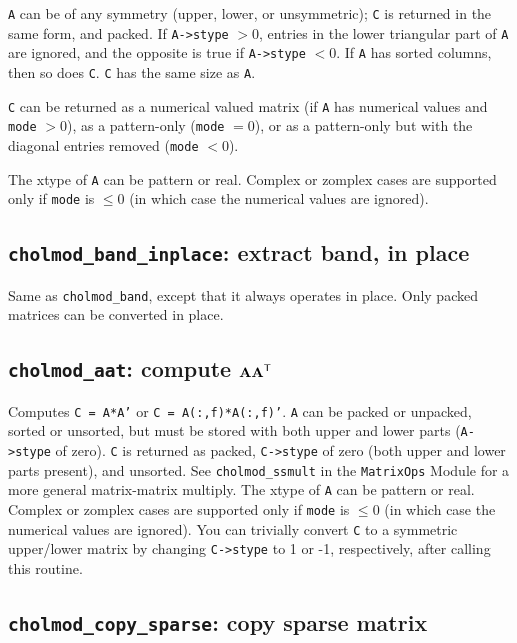 \documentclass[11pt]{article}
\newcommand{\m}[1]{{\bf{#1}}}       %
\newcommand{\tr}{^{\sf T}}          %
\begin{document}
{\tt A} can be of any symmetry (upper, lower, or unsymmetric); {\tt C} is returned in
the same form, and packed.  If {\tt A->stype} $> 0$, entries in the lower
triangular part of {\tt A} are ignored, and the opposite is true if
{\tt A->stype} $< 0$.  If {\tt A} has sorted columns, then so does {\tt C}.
{\tt C} has the same size as {\tt A}.

{\tt C} can be returned as a numerical valued matrix (if {\tt A} has numerical values
and {\tt mode} $> 0$), as a pattern-only ({\tt mode} $=0$), or as a pattern-only but with
the diagonal entries removed ({\tt mode} $< 0$).

The xtype of {\tt A} can be pattern or real.  Complex or zomplex cases are supported only
if {\tt mode} is $\le 0$ (in which case the numerical values are ignored).

\subsection{{\tt cholmod\_band\_inplace}: extract band, in place}


Same as {\tt cholmod\_band}, except that it always operates in place.
Only packed matrices can be converted in place.

\newpage \subsection{{\tt cholmod\_aat}: compute $\m{AA}\tr$}


Computes {\tt C = A*A'} or {\tt C = A(:,f)*A(:,f)'}.
{\tt A} can be packed or unpacked, sorted or unsorted, but must be stored with
both upper and lower parts ({\tt A->stype} of zero).  {\tt C} is returned as packed,
{\tt C->stype} of zero (both upper and lower parts present), and unsorted.  See
{\tt cholmod\_ssmult} in the {\tt MatrixOps} Module for a more general matrix-matrix
multiply.
The xtype of {\tt A} can be pattern or real.  Complex or zomplex cases are supported only
if {\tt mode} is $\le 0$ (in which case the numerical values are ignored).
You can trivially convert {\tt C} to a symmetric upper/lower matrix
by changing {\tt C->stype} to 1 or -1, respectively, after calling this routine.

\subsection{{\tt cholmod\_copy\_sparse}: copy sparse matrix}
\end{document}

